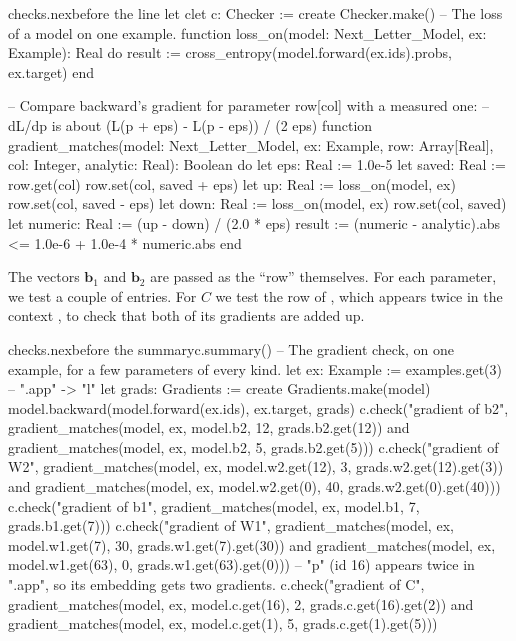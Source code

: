 \documentclass[11pt,a4paper,oneside,openany]{book}
\newcommand{\code}[1]{\texttt{\detokenize{#1}}}
\newcommand{\vect}[1]{\mathbf{#1}}
\begin{document}
\begin{addbefore}{checks.nex}{before the line let c}{let c: Checker := create Checker.make()}
-- The loss of a model on one example.
function loss_on(model: Next_Letter_Model, ex: Example): Real do
  result := cross_entropy(model.forward(ex.ids).probs, ex.target)
end

-- Compare backward's gradient for parameter row[col] with a measured one:
--     dL/dp  is about  (L(p + eps) - L(p - eps)) / (2 eps)
function gradient_matches(model: Next_Letter_Model, ex: Example, row: Array[Real],
  col: Integer, analytic: Real): Boolean do
  let eps: Real := 1.0e-5
  let saved: Real := row.get(col)
  row.set(col, saved + eps)
  let up: Real := loss_on(model, ex)
  row.set(col, saved - eps)
  let down: Real := loss_on(model, ex)
  row.set(col, saved)
  let numeric: Real := (up - down) / (2.0 * eps)
  result := (numeric - analytic).abs <= 1.0e-6 + 1.0e-4 * numeric.abs
end
\end{addbefore}

The vectors $\vect{b}_1$ and $\vect{b}_2$ are passed as the ``row''
themselves. For each parameter, we test a couple of entries. For $C$ we
test the row of \code{p}, which appears twice in the context \code{.app},
to check that both of its gradients are added up.

\begin{addbefore}{checks.nex}{before the summary}{c.summary()}
-- The gradient check, on one example, for a few parameters of every kind.
let ex: Example := examples.get(3)            -- ".app" -> "l"
let grads: Gradients := create Gradients.make(model)
model.backward(model.forward(ex.ids), ex.target, grads)
c.check("gradient of b2",
  gradient_matches(model, ex, model.b2, 12, grads.b2.get(12))
    and gradient_matches(model, ex, model.b2, 5, grads.b2.get(5)))
c.check("gradient of W2",
  gradient_matches(model, ex, model.w2.get(12), 3, grads.w2.get(12).get(3))
    and gradient_matches(model, ex, model.w2.get(0), 40, grads.w2.get(0).get(40)))
c.check("gradient of b1",
  gradient_matches(model, ex, model.b1, 7, grads.b1.get(7)))
c.check("gradient of W1",
  gradient_matches(model, ex, model.w1.get(7), 30, grads.w1.get(7).get(30))
    and gradient_matches(model, ex, model.w1.get(63), 0, grads.w1.get(63).get(0)))
-- "p" (id 16) appears twice in ".app", so its embedding gets two gradients.
c.check("gradient of C",
  gradient_matches(model, ex, model.c.get(16), 2, grads.c.get(16).get(2))
    and gradient_matches(model, ex, model.c.get(1), 5, grads.c.get(1).get(5)))
\end{addbefore}
\end{document}
